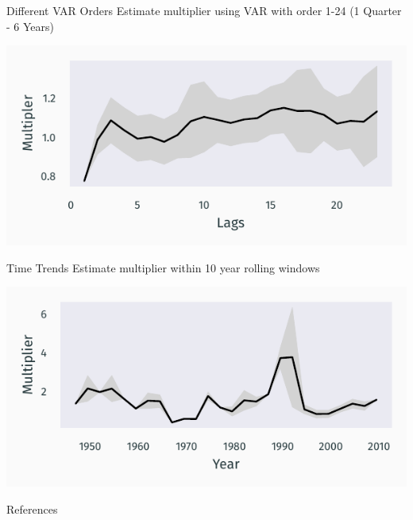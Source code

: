 \documentclass{beamer}
\begin{document}
\begin{frame}{Different VAR Orders} \label{frame:order}
    Estimate multiplier using VAR with order 1-24 (1 Quarter - 6 Years)

    \begin{center}
        \includegraphics{figures/c20_lags.pdf}

        \hyperlink{frame:robust}{}
    \end{center}
\end{frame}

\begin{frame}{Time Trends} \label{frame:time}
    Estimate multiplier within 10 year rolling windows

    \begin{center}
        \includegraphics{figures/c20_ts.pdf}

        \hyperlink{frame:robust}{}
    \end{center}
\end{frame}

\begin{frame}[allowframebreaks]{References}
    \printbibliography[heading=none]
\end{frame}
\end{document}
